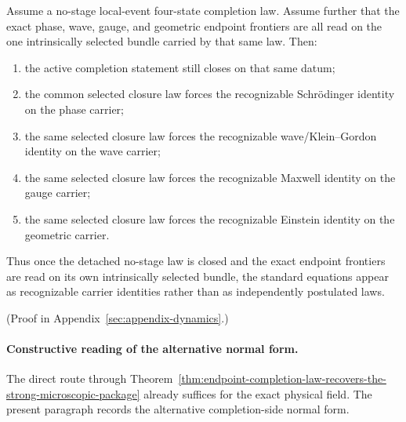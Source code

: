 \begin{theorem}
\label{thm:no-stage-completion-law-forces-the-recognizable-flagship-identities}
Assume a no-stage local-event four-state completion law. Assume further that
the exact phase, wave, gauge, and geometric endpoint frontiers are all read on
the one intrinsically selected bundle carried by that same law.
Then:
\begin{enumerate}
\item the active completion statement still closes on that same datum;
\item the common selected closure law forces the recognizable Schr\"odinger
      identity on the phase carrier;
\item the same selected closure law forces the recognizable
      wave/Klein--Gordon identity on the wave carrier;
\item the same selected closure law forces the recognizable Maxwell identity
      on the gauge carrier;
\item the same selected closure law forces the recognizable Einstein identity
      on the geometric carrier.
\end{enumerate}
Thus once the detached no-stage law is closed and the exact endpoint
frontiers are read on its own intrinsically selected bundle, the standard
equations appear as recognizable carrier identities rather than as
independently postulated laws.
\end{theorem}

(Proof in Appendix~\ref{sec:appendix-dynamics}.)

\paragraph{Constructive reading of the alternative normal form.}
The direct route through
Theorem~\ref{thm:endpoint-completion-law-recovers-the-strong-microscopic-package}
already suffices for the exact physical field. The present paragraph records
the alternative completion-side normal form.

